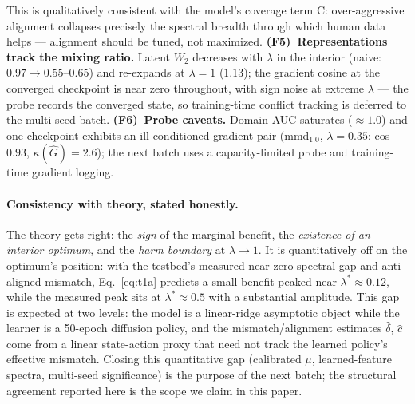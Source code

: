 This is qualitatively consistent with the model's coverage term C: over-aggressive alignment collapses precisely the spectral breadth through which human data helps --- alignment should be tuned, not maximized.
\textbf{(F5)~Representations track the mixing ratio.}
Latent $W_2$ decreases with $\lambda$ in the interior (naive: $0.97 \to 0.55$--$0.65$) and re-expands at $\lambda = 1$ ($1.13$); the gradient cosine at the converged checkpoint is near zero throughout, with sign noise at extreme $\lambda$ --- the probe records the converged state, so training-time conflict tracking is deferred to the multi-seed batch.
\textbf{(F6)~Probe caveats.}
Domain AUC saturates ($\approx 1.0$) and one checkpoint exhibits an ill-conditioned gradient pair (mmd$_{1.0}$, $\lambda{=}0.35$: cos $0.93$, $\kappa(\hat G) = 2.6$); the next batch uses a capacity-limited probe and training-time gradient logging.

\paragraph{Consistency with theory, stated honestly.}
The theory gets right: the \emph{sign} of the marginal benefit, the \emph{existence of an interior optimum}, and the \emph{harm boundary} at $\lambda \to 1$.
It is quantitatively off on the optimum's position: with the testbed's measured near-zero spectral gap and anti-aligned mismatch, Eq.~\eqref{eq:t1a} predicts a small benefit peaked near $\lambda^* \approx 0.12$, while the measured peak sits at $\lambda^* \approx 0.5$ with a substantial amplitude.
This gap is expected at two levels: the model is a linear-ridge asymptotic object while the learner is a 50-epoch diffusion policy, and the mismatch/alignment estimates $\hat\delta$, $\hat c$ come from a linear state-action proxy that need not track the learned policy's effective mismatch.
Closing this quantitative gap (calibrated $\mu$, learned-feature spectra, multi-seed significance) is the purpose of the next batch; the structural agreement reported here is the scope we claim in this paper.
